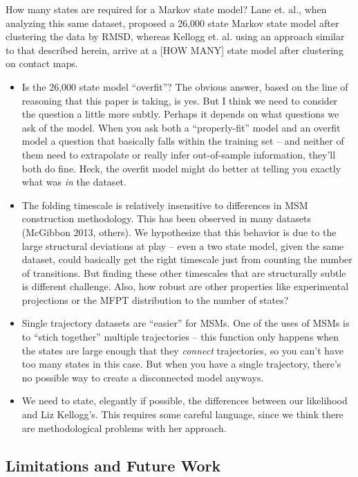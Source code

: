 \documentclass[twocolumn,floatfix,nofootinbib,aps]{revtex4-1}
\begin{document}
How many states are required for a Markov state model? Lane et. al., when analyzing this same dataset, proposed a 26,000 state Markov state model after clustering the data by RMSD, whereas Kellogg et. al. using an approach similar to that described herein, arrive at a [HOW MANY] state model after clustering on contact maps\cite{Lane2011Markov, Kellogg2012Evaluation}. 

\begin{itemize}
\item Is the 26,000 state model ``overfit''? The obvious answer, based on the line of reasoning that this paper is taking, is yes. But I think we need to consider the question a little more subtly. Perhaps it depends on what questions we ask of the model. When you ask both a ``properly-fit'' model and an overfit model a question that basically falls within the training set -- and neither of them need to extrapolate or really infer out-of-sample information, they'll both do fine. Heck, the overfit model might do better at telling you exactly what was \emph{in} the dataset.
\item The folding timescale is relatively insensitive to differences in MSM construction methodology. This has been observed in many datasets (McGibbon 2013, others). We hypothesize that this behavior is due to the large structural deviations at play -- even a two state model, given the same dataset, could basically get the right timescale just from counting the number of transitions. But finding these other timescales that are structurally subtle is different challenge. Also, how robust are other properties like experimental projections or the MFPT distribution to the number of states?
\item Single trajectory datasets are ``easier'' for MSMs. One of the uses of MSMs is to ``stich together'' multiple trajectories -- this function only happens when the states are large enough that they \emph{connect} trajectories, so you can't have too many states in this case. But when you have a single trajectory, there's no possible way to create a disconnected model anyways.
\item We need to state, elegantly if possible, the differences between our likelihood and Liz Kellogg's. This requires some careful language, since we think there are methodological problems with her approach.
\end{itemize}

\subsection{Limitations and Future Work}
\end{document}
